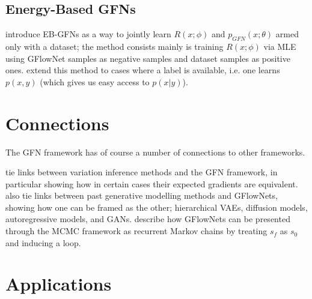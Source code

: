 \subsection{Energy-Based GFNs}
\citet{zhang2022generative} introduce EB-GFNs as a way to jointly learn $R(x;\phi)$ and $p_{GFN}(x;\theta)$ armed only with a dataset; the method consists mainly is training $R(x;\phi)$ via MLE using GFlowNet samples as negative samples and dataset samples as positive ones. \citet{ekbote2022consistent} extend this method to cases where a label is available, i.e. one learns $p(x, y)$ (which gives us easy access to $p(x|y)$).


\section{Connections}
The GFN framework has of course a number of connections to other frameworks.

\citet{malkin2022gflownets} tie links between variation inference methods and the GFN framework, in particular showing how in certain cases their expected gradients are equivalent. \citet{zhang2022unifying} also tie links between past generative modelling methods and GFlowNets, showing how one can be framed as the other; hierarchical VAEs, diffusion models, autoregressive models, and GANs. \citet{deleu2023generative} describe how GFlowNets can be presented through the MCMC framework as recurrent Markov chains by treating $s_f$ as $s_0$ and inducing a loop.


\section{Applications}
